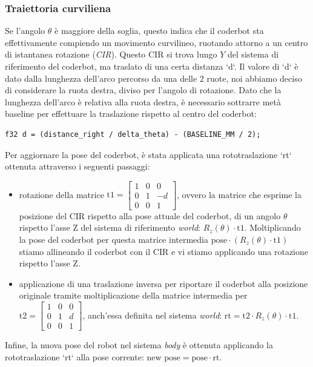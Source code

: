\documentclass[11pt]{article}
\begin{document}
\subsubsection{Traiettoria curviliena}
\label{sec:orge1eb7ac}
Se l'angolo \(\theta\) è maggiore della soglia, questo indica che il coderbot sta effettivamente compiendo un movimento curvilineo, ruotando attorno a un centro di istantanea rotazione (\emph{CIR}). Questo CIR si trova lungo \(Y\) del sistema di riferimento del coderbot, ma traslato di una certa distanza `d`.
Il valore di `d` è dato dalla lunghezza dell'arco percorso da una delle 2 ruote, noi abbiamo deciso di considerare la ruota destra, diviso per l'angolo di rotazione. Dato che la lunghezza dell'arco è relativa alla ruota destra, è necessario sottrarre metà baseline per effettuare la traslazione rispetto al centro del coderbot:
\begin{verbatim}
f32 d = (distance_right / delta_theta) - (BASELINE_MM / 2);
\end{verbatim}

Per aggiornare la pose del coderbot, è stata applicata una rototraslazione `rt` ottenuta attraverso i seguenti passaggi:
\begin{itemize}
\item rotazione della matrice \(\text{t1}= \begin{bmatrix}1&0&0\\0&1&-d\\0&0&1\end{bmatrix}\), ovvero la matrice che esprime la posizione del CIR rispetto alla pose attuale del coderbot, di un angolo \(\theta\) rispetto l'asse Z del sistema di riferimento \emph{world}: \(R_z(\theta)\cdot\text{t1}\). Moltiplicando la pose del coderbot per questa matrice intermedia \(\text{pose}\cdot (R_z(\theta)\cdot\text{t1})\) stiamo allineando il coderbot con il CIR e vi stiamo applicando una rotazione rispetto l'asse Z.
\item applicazione di una traslazione inversa per riportare il coderbot alla posizione originale tramite moltiplicazione della matrice intermedia per \(\text{t2}= \begin{bmatrix}1&0&0\\0&1&d\\0&0&1\end{bmatrix}\), anch'essa definita nel sistema \emph{world}: \(\text{rt}=\text{t2}\cdot R_z(\theta)\cdot\text{t1}\).
\end{itemize}
Infine, la nuova pose del robot nel sistema \emph{body} è ottenuta applicando la rototraslazione `rt` alla pose corrente: \(\text{new pose} = \text{pose}\cdot\text{rt}\).
\end{document}
